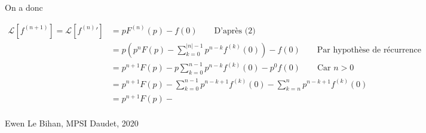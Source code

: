 \documentclass{article}
\begin{document}
On a donc

\begin{align*}
	\mathcal L[f^{(n+1)}] = \mathcal L[f^{(n)}'] &= pF^{(n)}(p) - f(0) \qquad \text{D'après (2)} \\
												 &= p\left( p^{n}F(p)-\sum_{k=0}^{|n|-1} p^{n-k} f^{(k)}(0)
												 \right) - f(0) \qquad \text{Par hypothèse de récurrence}\\
												 &= p^{n+1}F(p)-p \sum_{k=0}^{n-1} p^{n-k} f^{(k)}(0) - p^0f(0) \qquad \text{Car $n > 0$}\\
												 &= p^{n+1}F(p) - \sum_{k=0}^{n-1} p^{n-k+1} f^{(k)}(0) - \sum_{k=n}^{n} p^{n-k+1} f^{(k)}(0) \\
												 &= p^{n+1}F(p) -  \\
\end{align*}

\begin{flushright}
	{\footnotesize Ewen Le Bihan, MPSI Daudet, 2020}
\end{flushright}
\end{document}

